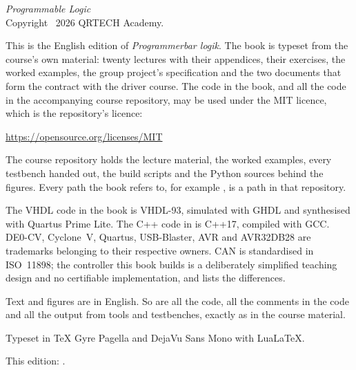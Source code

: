 \thispagestyle{empty}
\vspace*{\fill}
{\small
\noindent\textit{Programmable Logic}\\
Copyright \textcopyright\ 2026 QRTECH Academy.

\medskip
\noindent This is the English edition of \textit{Programmerbar logik}. The book is typeset from the
course's own material: twenty lectures with their appendices, their exercises, the worked examples,
the group project's specification and the two documents that form the contract with the driver
course. The code in the book, and all the code in the accompanying course repository, may be used
under the MIT licence, which is the repository's licence:

\medskip
\noindent\url{https://opensource.org/licenses/MIT}

\medskip
\noindent The course repository holds the lecture material, the worked examples, every testbench
handed out, the build scripts and the Python sources behind the figures. Every path the book refers
to, for example , is a path in that repository.

\medskip
\noindent The VHDL code in the book is VHDL-93, simulated with GHDL and synthesised with Quartus
Prime Lite. The C++ code in  is C++17, compiled with GCC. DE0-CV,
Cyclone~V, Quartus, USB-Blaster, AVR and AVR32DB28 are trademarks belonging to their respective
owners. CAN is standardised in ISO~11898; the controller this book builds is a deliberately
simplified teaching design and no certifiable implementation, and  lists the
differences.

\medskip
\noindent Text and figures are in English. So are all the code, all the comments in the code and
all the output from tools and testbenches, exactly as in the course material.

\medskip
\noindent Typeset in TeX Gyre Pagella and DejaVu Sans Mono with Lua\LaTeX.

\medskip
\noindent\textcolor{muted}{This edition: \bookedition.}
\par}
\cleardoublepage

